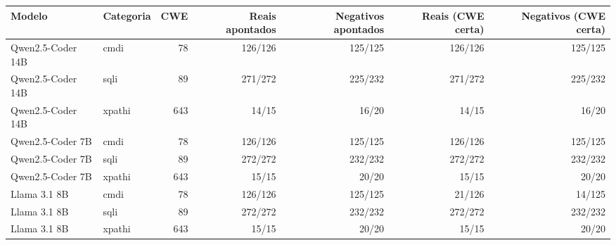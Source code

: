 \begin{tabular}{llrrrrr}
\hline
Modelo & Categoria & CWE & Reais apontados & Negativos apontados & Reais (CWE certa) & Negativos (CWE certa) \\
\hline
Qwen2.5-Coder 14B & cmdi & 78 & 126/126 & 125/125 & 126/126 & 125/125 \\
Qwen2.5-Coder 14B & sqli & 89 & 271/272 & 225/232 & 271/272 & 225/232 \\
Qwen2.5-Coder 14B & xpathi & 643 & 14/15 & 16/20 & 14/15 & 16/20 \\
Qwen2.5-Coder 7B & cmdi & 78 & 126/126 & 125/125 & 126/126 & 125/125 \\
Qwen2.5-Coder 7B & sqli & 89 & 272/272 & 232/232 & 272/272 & 232/232 \\
Qwen2.5-Coder 7B & xpathi & 643 & 15/15 & 20/20 & 15/15 & 20/20 \\
Llama 3.1 8B & cmdi & 78 & 126/126 & 125/125 & 21/126 & 14/125 \\
Llama 3.1 8B & sqli & 89 & 272/272 & 232/232 & 272/272 & 232/232 \\
Llama 3.1 8B & xpathi & 643 & 15/15 & 20/20 & 15/15 & 20/20 \\
\hline
\end{tabular}
